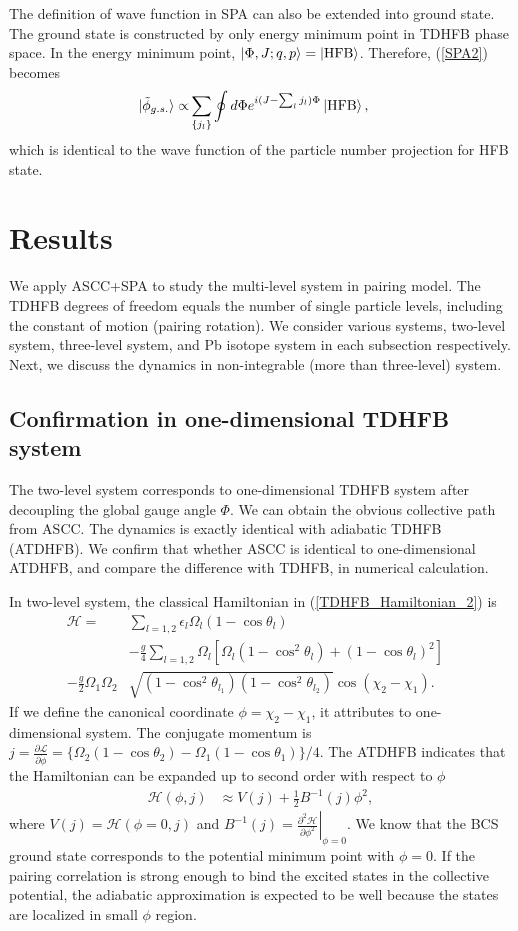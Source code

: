 \documentclass[%
superscriptaddress,
showpacs,
nofootinbib,
amsmath,amssymb,
aps,
prc,
twocolumn,
floatfix ]%
{revtex4-1}
\begin{document}
The definition of wave function in SPA can also be extended into ground state. The ground state is constructed by only energy minimum point in TDHFB phase space. In the energy minimum point, $\ket{\Phi,J;q,p}=\ket{\rm HFB}$. Therefore, (\ref{SPA2}) becomes
\begin{align}
 \ket{\tilde{\phi}_{g.s.}} \propto& \sum_{\{j_l\}} \oint d\Phi e^{i(J-\sum_l j_l)\Phi} \ket{\rm HFB},  
\end{align}
which is identical to the wave function of the particle number projection for HFB state.

\section{Results}
We apply ASCC+SPA to study the multi-level system in pairing model. The TDHFB degrees of freedom equals the number of single particle levels, including the constant of motion (pairing rotation). We consider various systems, two-level system, three-level system, and Pb isotope system in each subsection respectively. Next, we discuss the dynamics in non-integrable (more than three-level) system.  


\subsection{Confirmation in one-dimensional TDHFB system}
The two-level system corresponds to one-dimensional TDHFB system after decoupling the global gauge angle $\Phi$. We can obtain the obvious collective path from ASCC. The dynamics is exactly identical with adiabatic TDHFB (ATDHFB). We confirm that whether ASCC is identical to one-dimensional ATDHFB, and compare the difference with TDHFB, in numerical calculation.

In two-level system, the classical Hamiltonian in (\ref{TDHFB_Hamiltonian_2}) is
\begin{align}
\mathcal{H} 
  =& \sum_{l=1,2} \epsilon_l\Omega_l(1- \cos{\theta}_l)& \nonumber \\ 
 &- \frac{g}{4}\sum_{l=1,2} \Omega_l [\Omega_l(1-\cos^2{\theta}_l)+(1-\cos{\theta}_l)^2] \nonumber \\
- \frac{g}{2} \Omega_{1}\Omega_{2}&\sqrt{(1-\cos^2{\theta}_{l_1})(1-\cos^2{\theta}_{l_2})}\cos{(\chi_{2}-\chi_{1})}   .
\end{align}
If we define the canonical coordinate $\phi=\chi_2-\chi_1$, it attributes to one-dimensional system. The conjugate momentum is $j= \frac{\partial\mathcal{L}}{\partial\dot{\phi}} = \{\Omega_2(1-\cos{\theta}_2) - \Omega_1(1-\cos{\theta}_1)\}/4$. The ATDHFB indicates that the Hamiltonian can be expanded up to second order with respect to $\phi$
\begin{align}
  \mathcal{H}(\phi,j) &\approx V(j) + \frac{1}{2}B^{-1}(j)\phi^2,
\end{align}
where $V(j)=\mathcal{H}(\phi=0,j)$ and $B^{-1}(j)= \left. \frac{\partial^2\mathcal{H}}{\partial\phi^2} \right|_{\phi=0}$.
We know that the BCS ground state corresponds to the potential minimum point with $\phi=0$. If the pairing correlation is strong enough to bind the excited states in the collective potential,  the adiabatic approximation is expected to be well because the states are localized in small $\phi$ region. 
\end{document}
